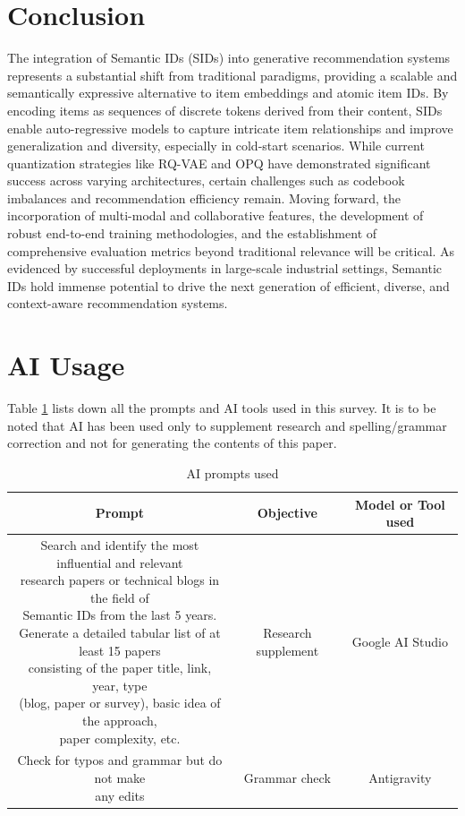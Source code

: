 \documentclass[11pt,a4paper]{article}
\begin{document}
\section{Conclusion}
The integration of Semantic IDs (SIDs) into generative recommendation systems represents a substantial shift from traditional paradigms, providing a scalable and semantically expressive alternative to item embeddings and atomic item IDs. By encoding items as sequences of discrete tokens derived from their content, SIDs enable auto-regressive models to capture intricate item relationships and improve generalization and diversity, especially in cold-start scenarios. While current quantization strategies like RQ-VAE and OPQ have demonstrated significant success across varying architectures, certain challenges such as codebook imbalances and recommendation efficiency remain. Moving forward, the incorporation of multi-modal and collaborative features, the development of robust end-to-end training methodologies, and the establishment of comprehensive evaluation metrics beyond traditional relevance will be critical. As evidenced by successful deployments in large-scale industrial settings, Semantic IDs hold immense potential to drive the next generation of efficient, diverse, and context-aware recommendation systems.

\printbibliography

\appendix
\section{AI Usage}
Table \ref{table:AIUsage} lists down all the prompts and AI tools used in this survey. It is to be noted that AI has been used only to supplement research and spelling/grammar correction and not for generating the contents of this paper.

\begin{table}
\centering
\begin{tabular}{| c | c | c |} 
 \hline
 \textbf{Prompt} & \textbf{Objective} & \textbf{Model or Tool used}\\
 \hline
 \makecell[l]{Search and identify the most influential and relevant \\ research papers or technical blogs in the field of \\ Semantic IDs from the last 5 years. \\ Generate a detailed tabular list of at least 15 papers \\ consisting of the paper title, link, year, type \\ (blog, paper or survey), basic idea of the approach, \\ paper complexity, etc.} & Research supplement & Google AI Studio \\
  \hline
 \makecell[l]{Check for typos and grammar but do not make \\any edits} & Grammar check & Antigravity \\
  \hline
\end{tabular}
\caption{AI prompts used}
\label{table:AIUsage}
\end{table}
\end{document}
